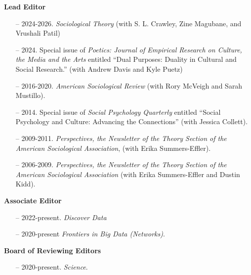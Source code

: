 \noindent\textbf{Lead Editor}

\begin{itemize}[itemsep=-0.5ex]
    \item[--] 2024-2026. {\em Sociological Theory} (with S. L. Crawley, Zine Magubane, and Vrushali Patil)
    \item[--] 2024. Special issue of {\em Poetics: Journal of Empirical Research on Culture, the Media and the Arts} entitled ``Dual Purposes: Duality in Cultural and Social Research.'' (with Andrew Davis and Kyle Puetz)
    \item[--] 2016-2020. {\em American Sociological Review} (with Rory McVeigh and Sarah Mustillo).
    \item[--] 2014. Special issue of {\em Social Psychology Quarterly} entitled ``Social Psychology and Culture: Advancing the Connections'' (with Jessica Collett).
    \item[--] 2009-2011. \emph{Perspectives, the Newsletter of the Theory Section of the  American Sociological Association}, (with Erika Summers-Effler). 
    \item[--] 2006-2009. \emph{Perspectives, the Newsletter of the Theory Section of the  American Sociological Association} (with Erika Summers-Effler and Dustin Kidd). 
\end{itemize}

\noindent\textbf{Associate Editor} 
\begin{itemize}[itemsep=-0.5ex]
    \item[--] 2022-present. {\em Discover Data}
    \item[--] 2020-present {\em Frontiers in Big Data (Networks)}.
\end{itemize}

\noindent\textbf{Board of Reviewing Editors} 
\begin{itemize}[itemsep=-0.5ex]
    \item[--] 2020-present. {\em Science}.
\end{itemize}

